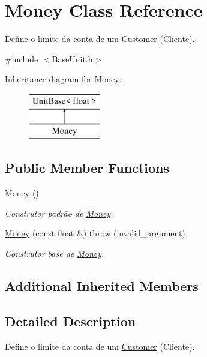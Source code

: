 \hypertarget{classMoney}{\section{Money Class Reference}
\label{d7/d9a/classMoney}
}


Define o limite da conta de um \hyperlink{classCustomer}{Customer} (Cliente).  




{\ttfamily \#include $<$Base\-Unit.\-h$>$}

Inheritance diagram for Money\-:\begin{figure}[H]
\begin{center}
\leavevmode
\includegraphics[height=2.000000cm]{d7/d9a/classMoney}
\end{center}
\end{figure}
\subsection*{Public Member Functions}
\begin{DoxyCompactItemize}
\item 
\hyperlink{classMoney_a883c32ea0f71c9d1422141c384d225ba}{Money} ()
\begin{DoxyCompactList}\small\item\em Construtor padrão de \hyperlink{classMoney}{Money}. \end{DoxyCompactList}\item 
\hyperlink{classMoney_a33986736e7432883ebd61584815b6681}{Money} (const float \&)  throw (invalid\-\_\-argument)
\begin{DoxyCompactList}\small\item\em Construtor base de \hyperlink{classMoney}{Money}. \end{DoxyCompactList}\end{DoxyCompactItemize}
\subsection*{Additional Inherited Members}


\subsection{Detailed Description}
Define o limite da conta de um \hyperlink{classCustomer}{Customer} (Cliente). 

